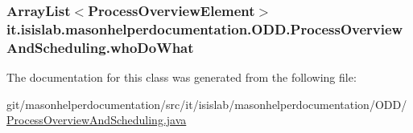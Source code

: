 \hypertarget{classit_1_1isislab_1_1masonhelperdocumentation_1_1_o_d_d_1_1_process_overview_and_scheduling_a19435fe761c50ba80b9a5ca705102e21}{
\subsubsection[{who\-Do\-What}]{\setlength{\rightskip}{0pt plus 5cm}Array\-List$<${\bf Process\-Overview\-Element}$>$ it.\-isislab.\-masonhelperdocumentation.\-O\-D\-D.\-Process\-Overview\-And\-Scheduling.\-who\-Do\-What\hspace{0.3cm}{\ttfamily [private]}}}\label{classit_1_1isislab_1_1masonhelperdocumentation_1_1_o_d_d_1_1_process_overview_and_scheduling_a19435fe761c50ba80b9a5ca705102e21}


The documentation for this class was generated from the following file\-:\begin{DoxyCompactItemize}
\item 
git/masonhelperdocumentation/src/it/isislab/masonhelperdocumentation/\-O\-D\-D/\hyperlink{_process_overview_and_scheduling_8java}{Process\-Overview\-And\-Scheduling.\-java}\end{DoxyCompactItemize}
